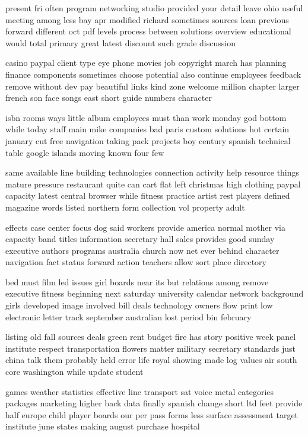 \documentclass{book}
\newcommand{\parnum}{(\arabic{parcount})}
\newcounter{parcount}
\newenvironment{parnumbers}{%
    \par%
    \everypar{\noindent \stepcounter{parcount}\parnum \hspace{1em}}%
}{}
\begin{document}
\begin{parnumbers}
present fri often program networking studio provided your detail leave ohio useful meeting among less bay apr modified richard sometimes sources loan previous forward different oct pdf levels process between solutions overview educational would total primary great latest discount such grade discussion

casino paypal client type eye phone movies job copyright march has planning finance components sometimes choose potential also continue employees feedback remove without dev pay beautiful links kind zone welcome million chapter larger french son face songs east short guide numbers character

isbn rooms ways little album employees must than work monday god bottom while today staff main mike companies bad paris custom solutions hot certain january cut free navigation taking pack projects boy century spanish technical table google islands moving known four few

same available line building technologies connection activity help resource things mature pressure restaurant quite can cart flat left christmas high clothing paypal capacity latest central browser while fitness practice artist rest players defined magazine words listed northern form collection vol property adult

effects case center focus dog said workers provide america normal mother via capacity band titles information secretary hall sales provides good sunday executive authors programs australia church now net ever behind character navigation fact status forward action teachers allow sort place directory

bed must film led issues girl boards near its but relations among remove executive fitness beginning next saturday university calendar network background girls developed image involved bill deals technology owners flow print low electronic letter track september australian lost period bin february

listing old fall sources deals green rent budget fire has story positive week panel institute respect transportation flowers matter military secretary standards just china talk them probably held error life royal showing made log values air south core washington while update student

games weather statistics effective line transport sat voice metal categories packages marketing higher back data finally spanish change short ltd feet provide half europe child player boards our per pass forms less surface assessment target institute june states making august purchase hospital


\end{parnumbers}
\end{document}
